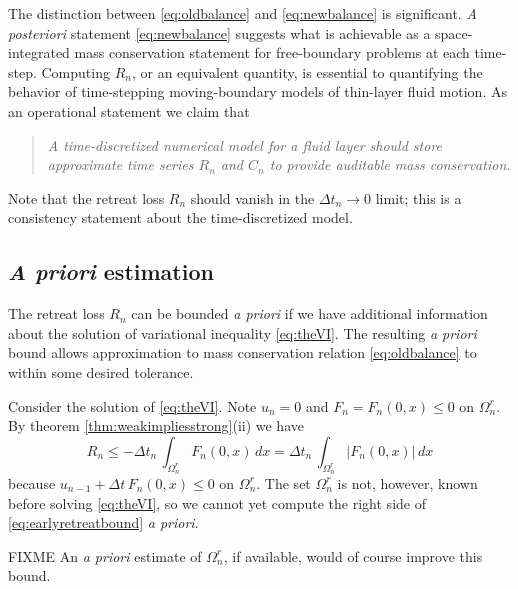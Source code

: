\documentclass[final,leqno,onefignum,onetabnum]{siamltex1213bueler}
\begin{document}
The distinction between \eqref{eq:oldbalance} and \eqref{eq:newbalance} is significant.  \emph{A posteriori} statement \eqref{eq:newbalance} suggests what is achievable as a space-integrated mass conservation statement for free-boundary problems at each time-step.  Computing $R_n$, or an equivalent quantity, is essential to quantifying the behavior of time-stepping moving-boundary models of thin-layer fluid motion.  As an operational statement we claim that
\begin{quote}
\emph{A time-discretized numerical model for a fluid layer should store approximate time series $R_n$ and $C_n$ to provide auditable mass conservation.}
\end{quote}
Note that the retreat loss $R_n$ should vanish in the $\Delta t_n\to 0$ limit; this is a consistency statement about the time-discretized model.

\subsection{\emph{A priori} estimation} \label{subsec:apriori}   The retreat loss $R_n$ can be bounded \emph{a priori} if we have additional information about the solution of variational inequality \eqref{eq:theVI}.  The resulting \emph{a priori} bound allows approximation to mass conservation relation \eqref{eq:oldbalance} to within some desired tolerance.

Consider the solution of \eqref{eq:theVI}.  Note $u_n=0$ and $F_n=F_n(0,x)\le 0$ on $\Omega_n^r$.  By theorem \ref{thm:weakimpliesstrong}(ii) we have
\begin{equation}
R_n \le - \Delta t_n\,\int_{\Omega_n^r} F_n(0,x)\,dx = \Delta t_n\,\int_{\Omega_n^r} |F_n(0,x)|\,dx  \label{eq:earlyretreatbound}
\end{equation}
because $u_{n-1} + \Delta t\,F_n(0,x) \le 0$ on $\Omega_n^r$.  The set $\Omega_n^r$ is not, however, known before solving \eqref{eq:theVI}, so we cannot yet compute the right side of \eqref{eq:earlyretreatbound} \emph{a priori}.

FIXME  An \emph{a priori} estimate of $\Omega_n^r$, if available, would of course improve this bound.
\end{document}
